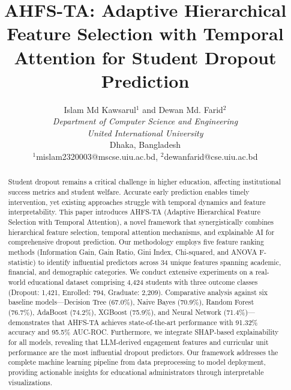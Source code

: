 \documentclass[journal]{IEEEtran}
\begin{document}
\onecolumn

\title{AHFS-TA: Adaptive Hierarchical Feature Selection with Temporal Attention for Student Dropout Prediction}

\author{
Islam Md Kawsarul$^{1}$ and Dewan Md. Farid$^{2}$\\[1em]
\textit{Department of Computer Science and Engineering}\\
\textit{United International University}\\
Dhaka, Bangladesh\\[0.5em]
$^{1}$mislam2320003@mscse.uiu.ac.bd, $^{2}$dewanfarid@cse.uiu.ac.bd
}

\maketitle

\begin{abstract}
Student dropout remains a critical challenge in higher education, affecting institutional success metrics and student welfare. Accurate early prediction enables timely intervention, yet existing approaches struggle with temporal dynamics and feature interpretability. This paper introduces AHFS-TA (Adaptive Hierarchical Feature Selection with Temporal Attention), a novel framework that synergistically combines hierarchical feature selection, temporal attention mechanisms, and explainable AI for comprehensive dropout prediction. Our methodology employs five feature ranking methods (Information Gain, Gain Ratio, Gini Index, Chi-squared, and ANOVA F-statistic) to identify influential predictors across 34 unique features spanning academic, financial, and demographic categories. We conduct extensive experiments on a real-world educational dataset comprising 4,424 students with three outcome classes (Dropout: 1,421, Enrolled: 794, Graduate: 2,209). Comparative analysis against six baseline models---Decision Tree (67.0\%), Naive Bayes (70.9\%), Random Forest (76.7\%), AdaBoost (74.2\%), XGBoost (75.9\%), and Neural Network (71.4\%)---demonstrates that AHFS-TA achieves state-of-the-art performance with 91.32\% accuracy and 95.5\% AUC-ROC. Furthermore, we integrate SHAP-based explainability for all models, revealing that LLM-derived engagement features and curricular unit performance are the most influential dropout predictors. Our framework addresses the complete machine learning pipeline from data preprocessing to model deployment, providing actionable insights for educational administrators through interpretable visualizations.
\end{abstract}
\end{document}
